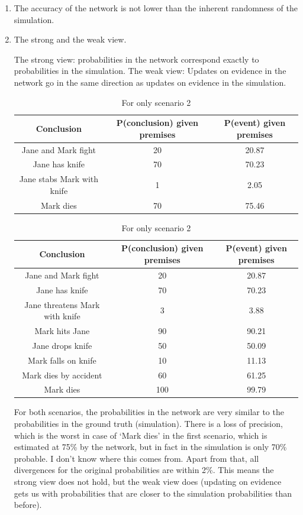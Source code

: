 \begin{enumerate}
\item The accuracy of the network is not lower than the inherent randomness of the simulation.



\item The strong and the weak view.

The strong view: probabilities in the network correspond exactly to probabilities in the simulation. The weak view: Updates on evidence in the network go in the same direction as updates on evidence in the simulation.

\begin{table}
\begin{tabular}{|c|c|c|}
 \hline
 Conclusion &P(conclusion) given premises & P(event) given premises\\
 \hline
 Jane and Mark fight   & 20 &  20.87   \\
 Jane has knife & 70 & 70.23 \\
 Jane stabs Mark with knife & 1 & 2.05 \\
 Mark dies & 70 & 75.46 \\ 
\hline
\end{tabular}
\caption{For only scenario 1.}

\begin{tabular}{|c|c|c|}
 \hline
 Conclusion &P(conclusion) given premises & P(event) given premises\\
 \hline
 Jane and Mark fight   & 20 &  20.87   \\
 Jane has knife & 70 & 70.23 \\
 Jane threatens Mark with knife & 3 & 3.88 \\
 Mark hits Jane & 90 & 90.21 \\
 Jane drops knife & 50 & 50.09 \\
 Mark falls on knife & 10 & 11.13\\
 Mark dies by accident & 60 & 61.25 \\
 Mark dies & 100 & 99.79 \\ 
\hline
\end{tabular}
\caption{For only scenario 2}
\end{table}

For both scenarios, the probabilities in the network are very similar to the probabilities in the ground truth (simulation). There is a
loss of precision, which is the worst in case of `Mark dies' in the first scenario, which is estimated at 75\% by the network, but in fact in the simulation is only 70\% probable. I don't know where this comes from. Apart from that, all divergences for the original probabilities are within 2\%. This means the strong view does not hold, but the weak view does (updating on evidence gets us with probabilities that are closer to the simulation probabilities than before).



\end{enumerate}
